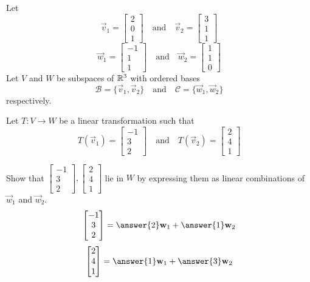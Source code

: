 \documentclass{ximera}
\begin{document}
\begin{problem}
Let $$\vec{v}_1=\begin{bmatrix}2\\0\\1\end{bmatrix}\quad\text{and}\quad\vec{v}_2=\begin{bmatrix}3\\1\\1\end{bmatrix}$$
$$\vec{w}_1=\begin{bmatrix}-1\\1\\1\end{bmatrix}\quad\text{and}\quad\vec{w}_2=\begin{bmatrix}1\\1\\0\end{bmatrix}$$
Let $V$ and $W$ be subspaces of $\mathbb{R}^3$ with ordered bases $$\mathcal{B}=\{\vec{v}_1, \vec{v}_2\}\quad\text{and}\quad\mathcal{C}=\{\vec{w}_1, \vec{w}_2\}$$
respectively.

Let $T:V\rightarrow W$ be a linear transformation such that 
$$T(\vec{v}_1)=\begin{bmatrix}-1\\3\\2\end{bmatrix}\quad\text{and}\quad T(\vec{v}_2)=\begin{bmatrix}2\\4\\1\end{bmatrix}$$

	\begin{problem}\label{prob:matlintransabstract2}
    Show that $\begin{bmatrix}-1\\3\\2\end{bmatrix}, \begin{bmatrix}2\\4\\1\end{bmatrix}$ lie in $W$ by expressing them as linear combinations of $\vec{w}_1$ and $\vec{w}_2$.
     $$\begin{bmatrix}-1\\3\\2\end{bmatrix}=\answer{2}\vec{w}_1+\answer{1}\vec{w}_2$$
    $$\begin{bmatrix}2\\4\\1\end{bmatrix}=\answer{1}\vec{w}_1+\answer{3}\vec{w}_2$$
    \end{problem}


\end{problem}
\end{document}

